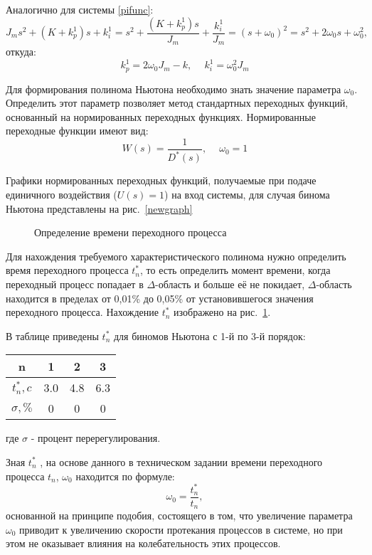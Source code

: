 Аналогично для системы \eqref{pifunc}:
\begin{equation}
	J_ms^2+(K+k_p^1)s+k_i^1 = s^2+\frac{(K+k_p^1)s}{J_m}+\frac{k_i^1}{J_m} =(s+\omega_0)^2= s^2+2\omega_0s+\omega_0^2,
\end{equation}
откуда:
\begin{equation}
	k_p^1 = 2\omega_0J_m-k, \phantom{- }k_i^1 = \omega_0^2J_m
\end{equation}

Для формирования полинома Ньютона необходимо знать значение параметра $\omega_0$.  Определить этот параметр позволяет метод стандартных переходных функций, основанный на нормированных переходных функциях. Нормированные переходные функции имеют вид:
\begin{equation}
	W(s) = \frac{1}{D^*(s)}, \phantom{-} \omega_0=1
\end{equation}

Графики нормированных переходных функций, получаемые при подаче единичного воздействия ($U(s) = 1 $) на вход системы, для случая бинома Ньютона представлены на рис.~\ref{newgraph}

\begin{figure}[h]
	\noindent{}
	\caption{Определение времени переходного процесса }
	\label{newtime}
\end{figure}

Для нахождения требуемого характеристического полинома нужно определить время переходного процесса $t_n^*$, то есть определить момент времени, когда переходный процесс попадает в $\Delta$-область и больше её не покидает, $\Delta$-область находится в пределах от 0,01\% до 0,05\% от установившегося значения переходного процесса. Нахождение  $t_n^*$ изображено на рис.~\ref{newtime}.

В таблице приведены $t_n^*$ для биномов Ньютона с 1-й по 3-й порядок:
\begin{center}
\begin{tabular}{ |c|c|c|c| } 
 \hline
 n &  1 & 2 & 3  \\ 
 \hline
 $t_n^*, c$ &  3.0 & 4.8 & 6.3  \\ 
 \hline
 $\sigma, \%$ &  0 & 0 & 0  \\ 
 \hline
\end{tabular}
\end{center}
где $\sigma$ - процент перерегулирования. 

Зная $t_n^*$ , на основе данного в техническом задании времени переходного процесса $t_n$, $\omega_0$ находится по формуле: 
\begin{equation}\label{omeganul}
	\omega_0=\frac{t_n^*}{t_n},
\end{equation}
основанной на принципе подобия, состоящего в том, что увеличение параметра $\omega_0$ приводит к увеличению скорости протекания процессов в системе, но при этом не оказывает влияния на колебательность этих процессов.

